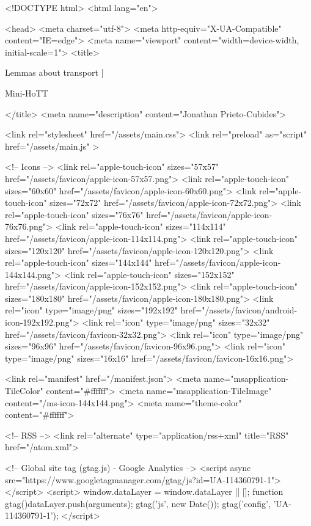 <!DOCTYPE html>
<html lang="en">

<head>
  <meta charset="utf-8">
  <meta http-equiv="X-UA-Compatible" content="IE=edge">
  <meta name="viewport" content="width=device-width, initial-scale=1">
  <title>
    
      
        Lemmas about transport  |
      
        Mini-HoTT
    
  </title>
  <meta name="description" content="Jonathan Prieto-Cubides">

  <link rel="stylesheet" href="/assets/main.css">
  <link rel="preload" as="script" href="/assets/main.js" >

  <!-- Icons -->
  <link rel="apple-touch-icon" sizes="57x57" href="/assets/favicon/apple-icon-57x57.png">
  <link rel="apple-touch-icon" sizes="60x60" href="/assets/favicon/apple-icon-60x60.png">
  <link rel="apple-touch-icon" sizes="72x72" href="/assets/favicon/apple-icon-72x72.png">
  <link rel="apple-touch-icon" sizes="76x76" href="/assets/favicon/apple-icon-76x76.png">
  <link rel="apple-touch-icon" sizes="114x114" href="/assets/favicon/apple-icon-114x114.png">
  <link rel="apple-touch-icon" sizes="120x120" href="/assets/favicon/apple-icon-120x120.png">
  <link rel="apple-touch-icon" sizes="144x144" href="/assets/favicon/apple-icon-144x144.png">
  <link rel="apple-touch-icon" sizes="152x152" href="/assets/favicon/apple-icon-152x152.png">
  <link rel="apple-touch-icon" sizes="180x180" href="/assets/favicon/apple-icon-180x180.png">
  <link rel="icon" type="image/png" sizes="192x192"  href="/assets/favicon/android-icon-192x192.png">
  <link rel="icon" type="image/png" sizes="32x32" href="/assets/favicon/favicon-32x32.png">
  <link rel="icon" type="image/png" sizes="96x96" href="/assets/favicon/favicon-96x96.png">
  <link rel="icon" type="image/png" sizes="16x16" href="/assets/favicon/favicon-16x16.png">

  <link rel="manifest" href="/manifest.json">
  <meta name="msapplication-TileColor" content="#ffffff">
  <meta name="msapplication-TileImage" content="/ms-icon-144x144.png">
  <meta name="theme-color" content="#ffffff">

  <!-- RSS -->
  <link rel="alternate" type="application/rss+xml" title="RSS" href="/atom.xml">

  <!-- Global site tag (gtag.js) - Google Analytics -->
  <script async src="https://www.googletagmanager.com/gtag/js?id=UA-114360791-1"></script>
  <script>
    window.dataLayer = window.dataLayer || [];
    function gtag(){dataLayer.push(arguments);}
    gtag('js', new Date());
    gtag('config', 'UA-114360791-1');
  </script>

